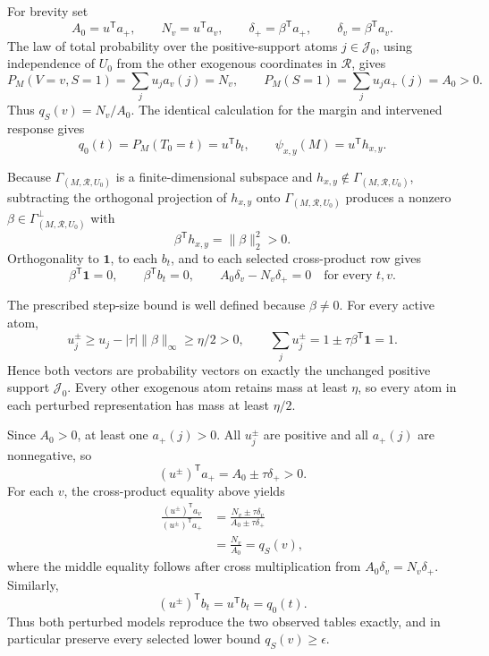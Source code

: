 For brevity set
\[
 A_0=u^{\mathsf T}a_+,
 \qquad N_v=u^{\mathsf T}a_v,
 \qquad \delta_+=\beta^{\mathsf T}a_+,
 \qquad \delta_v=\beta^{\mathsf T}a_v.
\]
The law of total probability over the positive-support atoms \(j\in\mathcal J_0\), using independence of \(U_0\) from the other exogenous coordinates in \(\mathcal R\), gives
\[
 P_M(V=v,S=1)=\sum_j u_j a_v(j)=N_v,
 \qquad P_M(S=1)=\sum_j u_j a_+(j)=A_0>0.
\]
Thus \(q_S(v)=N_v/A_0\).  The identical calculation for the margin and intervened response gives
\[
 q_0(t)=P_M(T_0=t)=u^{\mathsf T}b_t,
 \qquad
 \psi_{x,y}(M)=u^{\mathsf T}h_{x,y}.
\]

Because \(\Gamma_{(M,\mathcal R,U_0)}\) is a finite-dimensional subspace and \(h_{x,y}\notin\Gamma_{(M,\mathcal R,U_0)}\), subtracting the orthogonal projection of \(h_{x,y}\) onto \(\Gamma_{(M,\mathcal R,U_0)}\) produces a nonzero \(\beta\in\Gamma_{(M,\mathcal R,U_0)}^\perp\) with
\[
 \beta^{\mathsf T}h_{x,y}=\lVert\beta\rVert_2^2>0.
\]
Orthogonality to \(\mathbf 1\), to each \(b_t\), and to each selected cross-product row gives
\[
 \beta^{\mathsf T}\mathbf 1=0,
 \qquad \beta^{\mathsf T}b_t=0,
 \qquad A_0\delta_v-N_v\delta_+=0
 \quad\text{for every }t,v.
\]

The prescribed step-size bound is well defined because \(\beta\neq0\).  For every active atom,
\[
 u_j^\pm
 \geq u_j-\lvert\tau\rvert\lVert\beta\rVert_\infty
 \geq\eta/2>0,
 \qquad
 \sum_j u_j^\pm=1\pm\tau\beta^{\mathsf T}\mathbf 1=1.
\]
Hence both vectors are probability vectors on exactly the unchanged positive support \(\mathcal J_0\).  Every other exogenous atom retains mass at least \(\eta\), so every atom in each perturbed representation has mass at least \(\eta/2\).

Since \(A_0>0\), at least one \(a_+(j)>0\).  All \(u_j^\pm\) are positive and all \(a_+(j)\) are nonnegative, so
\[
 (u^\pm)^{\mathsf T}a_+=A_0\pm\tau\delta_+>0.
\]
For each \(v\), the cross-product equality above yields
\[
 \begin{aligned}
 \frac{(u^\pm)^{\mathsf T}a_v}{(u^\pm)^{\mathsf T}a_+}
 &=\frac{N_v\pm\tau\delta_v}{A_0\pm\tau\delta_+}\\
 &=\frac{N_v}{A_0}=q_S(v),
 \end{aligned}
\]
where the middle equality follows after cross multiplication from \(A_0\delta_v=N_v\delta_+\).  Similarly,
\[
 (u^\pm)^{\mathsf T}b_t=u^{\mathsf T}b_t=q_0(t).
\]
Thus both perturbed models reproduce the two observed tables exactly, and in particular preserve every selected lower bound \(q_S(v)\geq\epsilon\).

